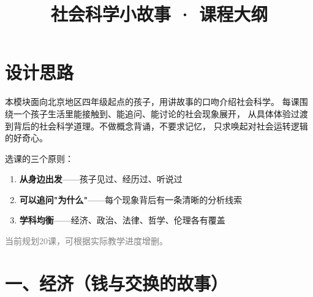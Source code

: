 \documentclass[a4paper,12pt]{ctexart}
\title{\textcolor{blue!70!black}{\Huge\textbf{社会科学小故事 · 课程大纲}}}
\author{}
\date{}
\begin{document}
\maketitle
\thispagestyle{empty}

\section*{\textcolor{blue!70!black}{设计思路}}

本模块面向北京地区四年级起点的孩子，用讲故事的口吻介绍社会科学。
每课围绕一个孩子生活里能接触到、能追问、能讨论的社会现象展开，
从具体体验过渡到背后的社会科学道理。不做概念背诵，不要求记忆，
只求唤起对社会运转逻辑的好奇心。

选课的三个原则：
\begin{enumerate}
  \item \textbf{从身边出发}——孩子见过、经历过、听说过
  \item \textbf{可以追问"为什么"}——每个现象背后有一条清晰的分析线索
  \item \textbf{学科均衡}——经济、政治、法律、哲学、伦理各有覆盖
\end{enumerate}

\vspace{0.3cm}
\textcolor{gray}{\small 当前规划20课，可根据实际教学进度增删。}

\newpage

\section*{\textcolor{orange!80!black}{一、经济（钱与交换的故事）}}
\end{document}
